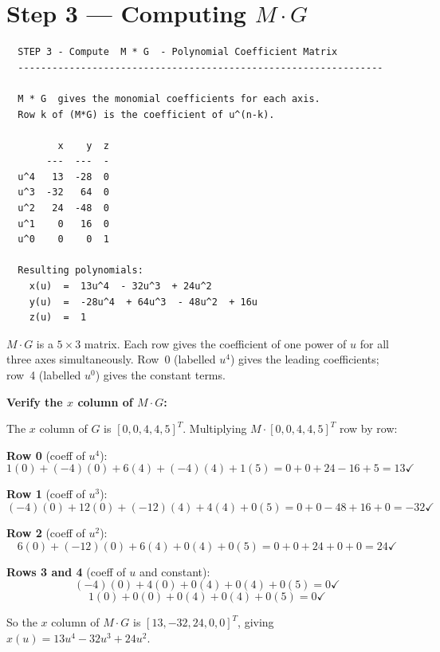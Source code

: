 \documentclass[12pt, a4paper]{article}
\begin{document}
\section{Step 3 --- Computing $M \cdot G$}

\begin{verbatim}
  STEP 3 - Compute  M * G  - Polynomial Coefficient Matrix
  ----------------------------------------------------------------

  M * G  gives the monomial coefficients for each axis.
  Row k of (M*G) is the coefficient of u^(n-k).

         x    y  z
       ---  ---  -
  u^4   13  -28  0
  u^3  -32   64  0
  u^2   24  -48  0
  u^1    0   16  0
  u^0    0    0  1

  Resulting polynomials:
    x(u)  =  13u^4  - 32u^3  + 24u^2
    y(u)  =  -28u^4  + 64u^3  - 48u^2  + 16u
    z(u)  =  1
\end{verbatim}

$M \cdot G$ is a $5 \times 3$ matrix.
Each row gives the coefficient of one power of $u$
for all three axes simultaneously.
Row~0 (labelled $u^4$) gives the leading coefficients;
row~4 (labelled $u^0$) gives the constant terms.

\begin{examplebox}
\textbf{Verify the $x$ column of $M \cdot G$:}

The $x$ column of $G$ is $[0, 0, 4, 4, 5]^T$.
Multiplying $M \cdot [0,0,4,4,5]^T$ row by row:

\medskip
\textbf{Row 0} (coeff of $u^4$):
\[
  1(0) + (-4)(0) + 6(4) + (-4)(4) + 1(5)
  = 0 + 0 + 24 - 16 + 5 = 13 \checkmark
\]

\textbf{Row 1} (coeff of $u^3$):
\[
  (-4)(0) + 12(0) + (-12)(4) + 4(4) + 0(5)
  = 0 + 0 - 48 + 16 + 0 = -32 \checkmark
\]

\textbf{Row 2} (coeff of $u^2$):
\[
  6(0) + (-12)(0) + 6(4) + 0(4) + 0(5)
  = 0 + 0 + 24 + 0 + 0 = 24 \checkmark
\]

\textbf{Rows 3 and 4} (coeff of $u$ and constant):
\[
  (-4)(0) + 4(0) + 0(4) + 0(4) + 0(5) = 0 \checkmark
\]
\[
  1(0) + 0(0) + 0(4) + 0(4) + 0(5) = 0 \checkmark
\]

So the $x$ column of $M \cdot G$ is $[13, -32, 24, 0, 0]^T$,
giving $x(u) = 13u^4 - 32u^3 + 24u^2$. \checkmark
\end{examplebox}
\end{document}
